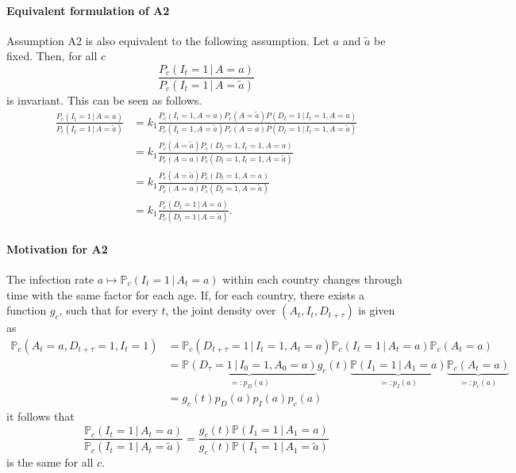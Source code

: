 \documentclass[a4paper]{article}
\renewcommand\P{\mathbb{P}}
\newcommand{\given}{\, \vert \,}
\begin{document}
\paragraph{Equivalent formulation of A2}
Assumption A2 is also equivalent to the following assumption. 
Let $a$ and $\tilde{a}$ be fixed. Then, for all $c$
\begin{equation}
\frac{P_c(I_t = 1\,|\,A = a)}{P_c(I_t = 1\,|\,A = \tilde{a})} 
\end{equation}
is invariant.
{\color{gray} This can be seen as follows.
\begin{align*}
\frac{P_c(I_t = 1\,|\,A = a)}{P_c(I_t = 1\,|\,A = \tilde{a})} 
&= k_1
\frac{P_c(I_t = 1,A = a)P_c(A = \tilde{a})
P(D_t = 1\,|\,I_t = 1, A = a)}
{P_c(I_t = 1,A = \tilde{a})P_c(A = a)P(D_t = 1\,|\,I_t = 1, A = \tilde{a})} \\
&= k_1
\frac{P_c(A = \tilde{a})
P_c(D_t = 1,I_t = 1, A = a)}
{P_c(A = a)P_c(D_t = 1,I_t = 1, A = \tilde{a})}\\
&= k_1
\frac{P_c(A = \tilde{a})
P_c(D_t = 1,A = a)}
{P_c(A = a)P_c(D_t = 1, A = \tilde{a})}\\
&= k_1
\frac{P_c(D_t = 1\,|\,A = a)}
{P_c(D_t = 1\,|\, A = \tilde{a})}.
\end{align*}
}



\paragraph{Motivation for A2}
The infection rate $a \mapsto \P_c(I_{t} = 1 \given A_t = a)$ within 
each country changes through time with the same factor for each age. If, for each country, there exists a function $g_c$, such that for every $t$, the joint
density over $(A_t,I_t,D_{t+\tau})$ is given as
%
\begin{align*}
\P_c(A_t = a, D_{t+\tau} = 1, I_t = 1)	&= \P_c(D_{t+\tau} = 1 \given I_t = 1, A_t = a)  \P_c(I_t = 1 \given A_t = a) \P_c(A_t = a) \\
															&= \underbrace{\P(D_{\tau} = 1 \given I_0 = 1, A_0 = a)}_{=:p_D(a)} g_c(t) \underbrace{\P(I_1 = 1 \given A_1 = a)}_{=:p_I(a)} \underbrace{\P_c(A_t = a)}_{=:p_c(a)} \\
															&=  g_c(t) p_D(a) p_I(a) p_c(a)
\end{align*}
%
it follows that 
$$
\frac{\P_c(I_t = 1 \given A_t = a)}{\P_c(I_t = 1 \given A_t = \tilde{a})} 
= 
\frac{
g_c(t) \P(I_1 = 1 \given A_1 = a)}{
g_c(t) \P(I_1 = 1 \given A_1 = \tilde{a})}
$$
is the same for all $c$. 
\end{document}
